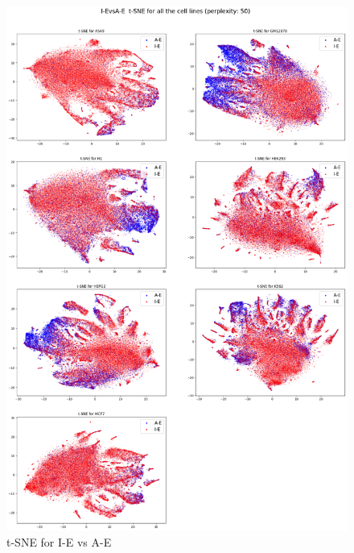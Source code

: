 \begin{figure}[h]
\centering
\includegraphics[width=12cm]{images/tsne_decomp_plots/20200410-232543_I-EvsA-E_tsne_plot.png}
\caption{t-SNE for I-E vs A-E}
\label{fig:tsneIEvsAE}
\end{figure}

